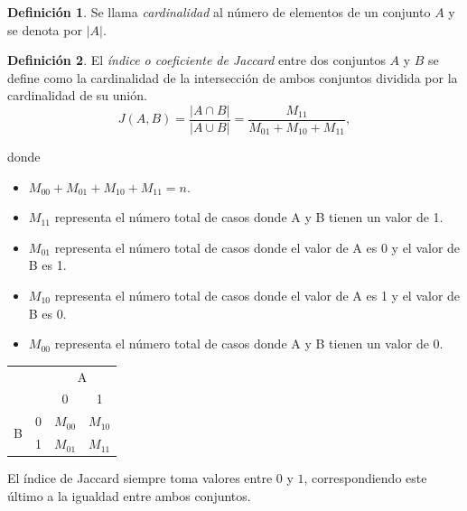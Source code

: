 \documentclass[12pt]{report} %
\theoremstyle{definition}
\newtheorem{definition}{Definición}[section]
\begin{document}
{\begin{definition}
	Se llama \textit{cardinalidad} al número de elementos de un conjunto $A$ y se denota por $\left| A \right| $.\cite{cardinalidad}
\end{definition}

\begin{definition}
El \textit{índice o coeficiente de Jaccard} entre dos conjuntos $A$ y $B$ se define como la cardinalidad de la intersección de ambos conjuntos dividida por la cardinalidad de su unión.\cite{jacard}
\begin{equation}
J(A,B) = \dfrac{\left| A \cap B \right| }{\left| A \cup B \right|} = \dfrac{M_{11}}{M_{01} + M_{10} + M_{11}},
\end{equation}

\noindent donde

\begin{itemize}
	\item $M_ {00} + M_ {01} + M_ {10} + M_ {11} = n.$
	\item $M_ {11}$ representa el número total de casos donde A y B tienen un valor de 1.
	\item $M_{01}$ representa el número total de casos donde el valor de A es 0 y el valor de B es 1.
	\item $M_{10}$ representa el número total de casos donde el valor de A es 1 y el valor de B es 0.
	\item $M_ {00}$ representa el número total de casos donde A y B tienen un valor de 0.
\end{itemize}

\begin{table}[H]
	\centering
	\begin{tabular}{|c|c|c|c|}
		\hline
		\multicolumn{2}{|c|}{\multirow{2}{*}{}} & \multicolumn{2}{c|}{A} \\ \cline{3-4} 
		\multicolumn{2}{|c|}{}                  & 0          & 1         \\ \hline
		\multirow{2}{*}{B}          & 0         & $M_{00}$   & $M_{10}$  \\ \cline{2-4} 
		& 1         & $M_{01}$   & $M_{11}$  \\ \hline
	\end{tabular}
\end{table}

\end{definition}

El índice de Jaccard siempre toma valores entre $0$ y $1$, correspondiendo este último a la igualdad entre ambos conjuntos.\\

}
\end{document}
